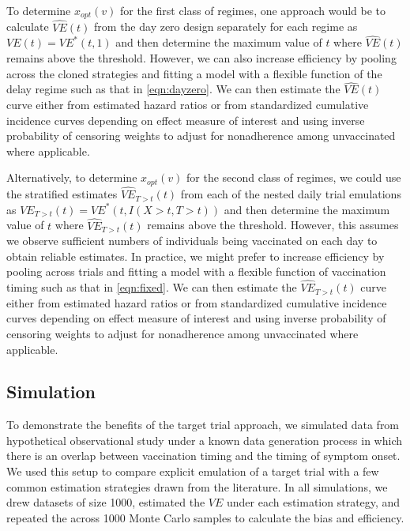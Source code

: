 \begin{appendices}
\begin{refsection}
    To determine $x_{opt}(v)$ for the first class of regimes, one approach would be to calculate $\widehat{VE}(t)$ from the day zero design separately for each regime as $VE(t) = VE^*(t, 1)$ and then determine the maximum value of $t$ where $\widehat{VE}(t)$ remains above the threshold. However, we can also increase efficiency by pooling across the cloned strategies and fitting a model with a flexible function of the delay regime such as that in \ref{eqn:dayzero}. We can then estimate the $\widehat{VE}(t)$ curve either from estimated hazard ratios or from standardized cumulative incidence curves depending on effect measure of interest and using inverse probability of censoring weights to adjust for nonadherence among unvaccinated where applicable.

    Alternatively, to determine $x_{opt}(v)$ for the second class of regimes, we could use the stratified estimates $\widehat{VE}_{T > t}(t)$ from each of the nested daily trial emulations as $VE_{T > t}(t) = VE^*(t, I(X > t, T > t))$ and then determine the maximum value of $t$ where  $\widehat{VE}_{T > t}(t)$ remains above the threshold. However, this assumes we observe sufficient numbers of individuals being vaccinated on each day to obtain reliable estimates. In practice, we might prefer to increase efficiency by pooling across trials and fitting a model with a flexible function of vaccination timing such as that in \ref{eqn:fixed}. We can then estimate the $\widehat{VE}_{T > t}(t)$ curve either from estimated hazard ratios or from standardized cumulative incidence curves depending on effect measure of interest and using inverse probability of censoring weights to adjust for nonadherence among unvaccinated where applicable.

    
    

    

    \clearpage 
    \subsection{Simulation} \label{sec:simulation_appendix}
    To demonstrate the benefits of the target trial approach, we simulated data from hypothetical observational study under a known data generation process in which there is an overlap between vaccination timing and the timing of symptom onset. We used this setup to compare explicit emulation of a target trial with a few common estimation strategies drawn from the literature. In all simulations, we drew datasets of size 1000, estimated the $VE$ under each estimation strategy, and repeated the across 1000 Monte Carlo samples to calculate the bias and efficiency.


\end{refsection}
\end{appendices}
